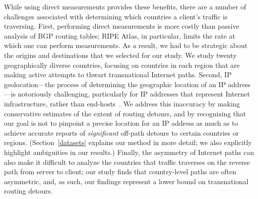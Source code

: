 While using direct measurements provides these benefits, there are a number of 
challenges associated with determining which countries a
client's traffic is traversing.  First,
performing direct measurements is more costly than passive analysis of BGP
routing tables; RIPE Atlas, in particular, limits the rate at which one can
perform measurements.  As a result, we had to be strategic about the origins
and destinations that we selected for our study. We study twenty
geographically diverse countries,  focusing on countries in each region that
are making active attempts to thwart transnational Internet paths.  Second, IP
geolocation---the process of determining the geographic location of an IP
address---is notoriously challenging, particularly for IP addresses that
represent Internet infrastructure, rather than end-hosts~\cite{gharaibeh2017look}. We address this
inaccuracy by making conservative estimates of the extent of routing detours,
and by recognizing that our goal is not to pinpoint a precise location for an
IP address as much as to achieve accurate reports of {\em significant} off-path 
detours to certain countries or regions. (Section~\ref{datasets} explains
our method in more detail; we also explicitly highlight ambiguities in our
results.) Finally, the asymmetry of Internet paths can also make it difficult
to analyze the countries that traffic traverses on the reverse path from
server to client; our study finds that country-level paths are often
asymmetric, and, as such, our findings represent a lower bound on
transnational routing detours.

